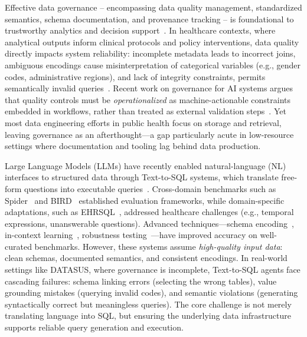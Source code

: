 \documentclass[sigconf,natbib=false]{acmart}
\begin{document}
Effective data governance -- encompassing data quality management, standardized semantics, schema documentation, and provenance tracking -- is foundational to trustworthy analytics and decision support~\cite{OECD2022}. In healthcare contexts, where analytical outputs inform clinical protocols and policy interventions, data quality directly impacts system reliability: incomplete metadata leads to incorrect joins, ambiguous encodings cause misinterpretation of categorical variables (e.g., gender codes, administrative regions), and lack of integrity constraints, permits semantically invalid queries~\cite{reddy2020}. Recent work on governance for AI systems argues that quality controls must be \textit{operationalized} as machine-actionable constraints embedded in workflows, rather than treated as external validation steps~\cite{janssen2020}. Yet most data engineering efforts in public health focus on storage and retrieval, leaving governance as an afterthought—a gap particularly acute in low-resource settings where documentation and tooling lag behind data production.

Large Language Models (LLMs) have recently enabled natural-language (NL) interfaces to structured data through Text-to-SQL systems, which translate free-form questions into executable queries~\cite{hong2024survey}. Cross-domain benchmarks such as Spider~\cite{yu2018spider} and BIRD~\cite{li2023bird} established evaluation frameworks, while domain-specific adaptations, such as EHRSQL~\cite{lee2023ehrsql}, addressed healthcare challenges (e.g., temporal expressions, unanswerable questions). Advanced techniques—schema encoding~\cite{ratsql2020}, in-context learning~\cite{zhang2023actsql}, robustness testing~\cite{ma2022mtteql}—have improved accuracy on well-curated benchmarks. However, these systems assume \textit{high-quality input data}: clean schemas, documented semantics, and consistent encodings. In real-world settings like DATASUS, where governance is incomplete, Text-to-SQL agents face cascading failures: schema linking errors (selecting the wrong tables), value grounding mistakes (querying invalid codes), and semantic violations (generating syntactically correct but meaningless queries). The core challenge is not merely translating language into SQL, but ensuring the underlying data infrastructure supports reliable query generation and execution.
\end{document}

